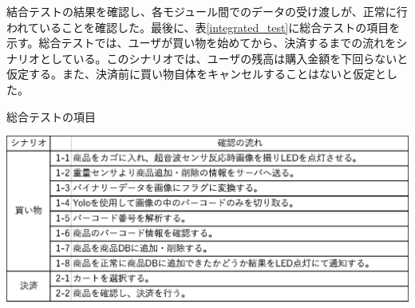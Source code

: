 \newpage

結合テストの結果を確認し、各モジュール間でのデータの受け渡しが、正常に行われていることを確認した。最後に、表\ref{integrated_test}に総合テストの項目を示す。総合テストでは、ユーザが買い物を始めてから、決済するまでの流れをシナリオとしている。このシナリオでは、ユーザの残高は購入金額を下回らないと仮定する。また、決済前に買い物自体をキャンセルすることはないと仮定とした。

\begin{table}[htbp]
\centering
\caption{総合テストの項目}
\includegraphics[width=15cm]{./pic/integrated_test.eps}
\label{integrated_test}
\end{table}

　

